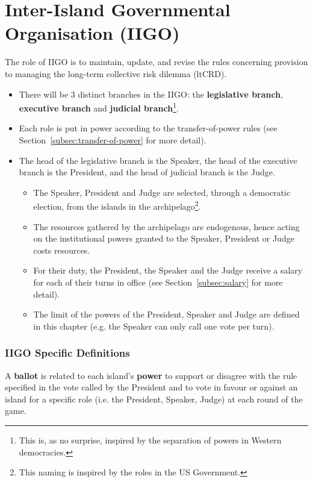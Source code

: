 \chapter{Inter-Island Governmental Organisation (IIGO)}


The role of IIGO is to maintain, update, and revise the rules concerning provision to managing the long-term collective risk dilemma (ltCRD). 

\begin{itemize}
    \item There will be 3 distinct branches in the IIGO: the \textbf{legislative branch}, \textbf{executive branch} and \textbf{judicial branch}\footnote{This is, as no surprise, inspired by the separation of powers in Western democracies.}.
    \item Each role is put in power according to the  transfer-of-power rules (see Section~\ref{subsec:transfer-of-power} for more detail).
    \item The head of the legislative branch is the Speaker, the head of the executive branch is the President, and the head of judicial branch is the Judge.
    \begin{itemize}
        \item  The Speaker, President and Judge are selected, through a democratic election, from the islands in the archipelago\footnote{This naming is inspired by the roles in the US Government.}.
        \item The resources gathered by the archipelago are endogenous, hence acting on the institutional powers granted to the Speaker, President or Judge costs resources. 
        \item For their duty, the President, the Speaker and the Judge receive a salary for each of their turns in office (see Section~\ref{subsec:salary} for more detail).
        \item The limit of the powers of the President, Speaker and Judge are defined in this chapter (e.g. the Speaker can only call one vote per turn).
 
    \end{itemize}
\end{itemize}

\subsection{IIGO Specific Definitions}
\begin{definition} \label{def:ballot}
    A \textbf{ballot} is related to each island's \textbf{power} to support or disagree with the rule specified in the vote called by the President and to vote in favour or against an island for a specific role (i.e. the President, Speaker, Judge) at each round of the game.
\end{definition}



